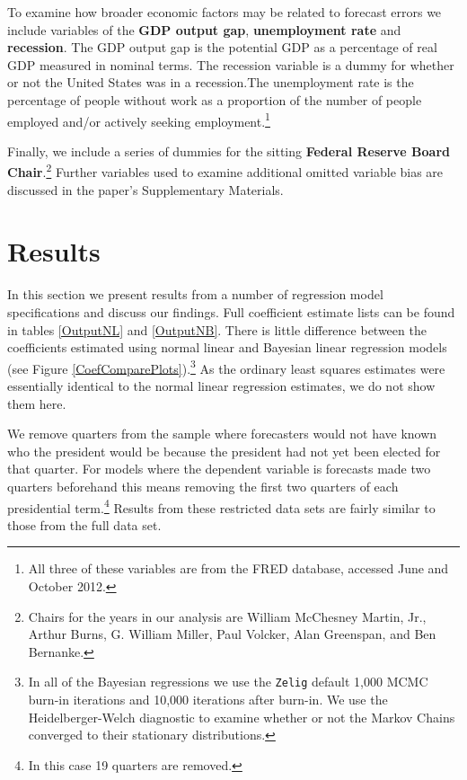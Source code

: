 \documentclass[a4paper]{article}
\begin{document}
To examine how broader economic factors may be related to forecast errors we include variables of the {\bf{GDP output gap}}, {\bf{unemployment rate}} and {\bf{recession}}. The GDP output gap is the potential GDP as a percentage of real GDP measured in nominal terms. The recession variable is a dummy for whether or not the United States was in a recession.The unemployment rate is the percentage of people without work as a proportion of the number of people employed and/or actively seeking employment.\footnote{All three of these variables are from the FRED database, accessed June and October 2012.}

Finally, we include a series of dummies for the sitting {\bf{Federal Reserve Board Chair}}.\footnote{Chairs for the years in our analysis are William McChesney Martin, Jr., Arthur Burns, G. William Miller, Paul Volcker, Alan Greenspan, and Ben Bernanke.} Further variables used to examine additional omitted variable bias are discussed in the paper's Supplementary Materials.

\section{Results}

In this section we present results from a number of regression model specifications and discuss our findings. Full coefficient estimate lists can be found in tables \ref{OutputNL} and \ref{OutputNB}. There is little difference between the coefficients estimated using normal linear and Bayesian linear regression models (see Figure \ref{CoefComparePlots}).\footnote{In all of the Bayesian regressions we use the {\tt{Zelig}} default 1,000 MCMC burn-in iterations and 10,000 iterations after burn-in. We use the Heidelberger-Welch diagnostic to examine whether or not the Markov Chains converged to their stationary distributions.} As the ordinary least squares estimates were essentially identical to the normal linear regression estimates, we do not show them here.

We remove quarters from the sample where forecasters would not have known who the president would be because the president had not yet been elected for that quarter. For models where the dependent variable is forecasts made two quarters beforehand this means removing the first two quarters of each presidential term.\footnote{In this case 19 quarters are removed.} Results from these restricted data sets are fairly similar to those from the full data set.
\end{document}
